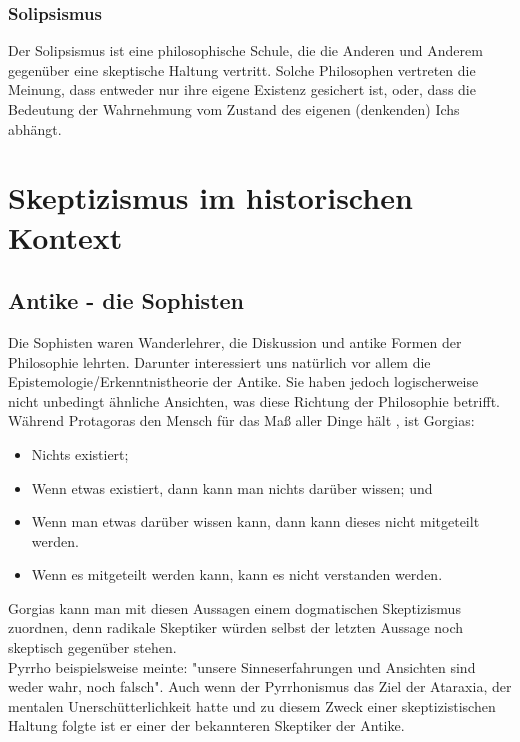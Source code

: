 \documentclass[12pt,a4paper]{article}
\begin{document}
		\subsubsection{Solipsismus}
Der Solipsismus ist eine philosophische Schule, die die Anderen und Anderem gegenüber eine skeptische Haltung vertritt. Solche Philosophen vertreten die Meinung, dass entweder nur ihre eigene Existenz gesichert ist, oder, dass die Bedeutung der Wahrnehmung vom Zustand des eigenen (denkenden) Ichs abhängt. %
\section{Skeptizismus im historischen Kontext}
	\subsection{Antike - die Sophisten}
Die Sophisten waren Wanderlehrer, die Diskussion und antike Formen der Philosophie lehrten. Darunter interessiert uns %
natürlich vor allem die Epistemologie/Erkenntnistheorie der Antike. Sie haben jedoch logischerweise nicht unbedingt ähnliche Ansichten, was diese Richtung der Philosophie betrifft. Während Protagoras den Mensch für das Maß aller Dinge hält%
, ist Gorgias:
\begin{itemize}
\item Nichts existiert;
\item Wenn etwas existiert, dann kann man nichts darüber wissen; und
\item Wenn man etwas darüber wissen kann, dann kann dieses nicht mitgeteilt werden.
\item Wenn es mitgeteilt werden kann, kann es nicht verstanden werden.
\end{itemize}%
Gorgias kann man mit diesen Aussagen einem dogmatischen Skeptizismus zuordnen, denn radikale Skeptiker würden selbst der letzten Aussage noch skeptisch gegenüber stehen.\\
Pyrrho beispielsweise meinte: "unsere Sinneserfahrungen und Ansichten sind weder wahr, noch falsch".%
 Auch wenn der Pyrrhonismus das Ziel der Ataraxia, der mentalen Unerschütterlichkeit hatte und zu diesem Zweck einer skeptizistischen Haltung folgte ist er einer der bekannteren Skeptiker der Antike.%
\end{document}
